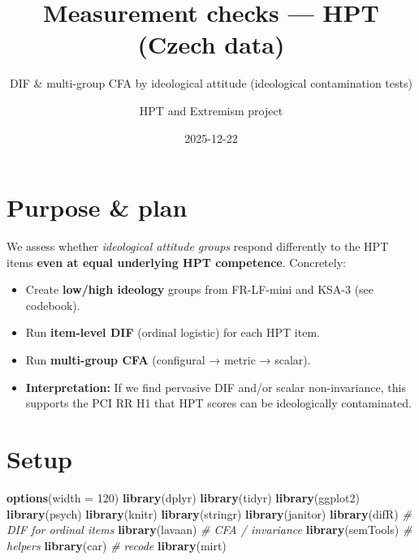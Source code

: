 \documentclass[
  10pt,
]{article}
\title{Measurement checks --- HPT (Czech data)}
\subtitle{DIF \& multi-group CFA by ideological attitude (ideological
contamination tests)}
\author{HPT and Extremism project}
\date{2025-12-22}
\newenvironment{Shaded}{\begin{snugshade}}{\end{snugshade}}
\newcommand{\AttributeTok}[1]{\textcolor[rgb]{0.13,0.29,0.53}{#1}}
\newcommand{\CommentTok}[1]{\textcolor[rgb]{0.56,0.35,0.01}{\textit{#1}}}
\newcommand{\DecValTok}[1]{\textcolor[rgb]{0.00,0.00,0.81}{#1}}
\newcommand{\FunctionTok}[1]{\textcolor[rgb]{0.13,0.29,0.53}{\textbf{#1}}}
\newcommand{\NormalTok}[1]{#1}
\providecommand{\tightlist}{%
  \setlength{\itemsep}{0pt}\setlength{\parskip}{0pt}}
\begin{document}
\maketitle

{
\setcounter{tocdepth}{3}
\tableofcontents
}
\hypertarget{purpose-plan}{%
\section{Purpose \& plan}\label{purpose-plan}}

We assess whether \emph{ideological attitude groups} respond differently
to the HPT items \textbf{even at equal underlying HPT competence}.
Concretely:

\begin{itemize}
\tightlist
\item
  Create \textbf{low/high ideology} groups from FR-LF-mini and KSA-3
  (see codebook).\\
\item
  Run \textbf{item-level DIF} (ordinal logistic) for each HPT item.
\item
  Run \textbf{multi-group CFA} (configural → metric → scalar).
\item
  \textbf{Interpretation:} If we find pervasive DIF and/or scalar
  non-invariance, this supports the PCI RR H1 that HPT scores can be
  ideologically contaminated.
\end{itemize}

\hypertarget{setup}{%
\section{Setup}\label{setup}}

\begin{Shaded}
\begin{Highlighting}[]
\FunctionTok{options}\NormalTok{(}\AttributeTok{width =} \DecValTok{120}\NormalTok{)}
\FunctionTok{library}\NormalTok{(dplyr)}
\FunctionTok{library}\NormalTok{(tidyr)}
\FunctionTok{library}\NormalTok{(ggplot2)}
\FunctionTok{library}\NormalTok{(psych)}
\FunctionTok{library}\NormalTok{(knitr)}
\FunctionTok{library}\NormalTok{(stringr)}
\FunctionTok{library}\NormalTok{(janitor)}
\FunctionTok{library}\NormalTok{(difR)        }\CommentTok{\# DIF for ordinal items}
\FunctionTok{library}\NormalTok{(lavaan)      }\CommentTok{\# CFA / invariance}
\FunctionTok{library}\NormalTok{(semTools)    }\CommentTok{\# helpers}
\FunctionTok{library}\NormalTok{(car)         }\CommentTok{\# recode}
\FunctionTok{library}\NormalTok{(mirt)}
\end{Highlighting}
\end{Shaded}
\end{document}

